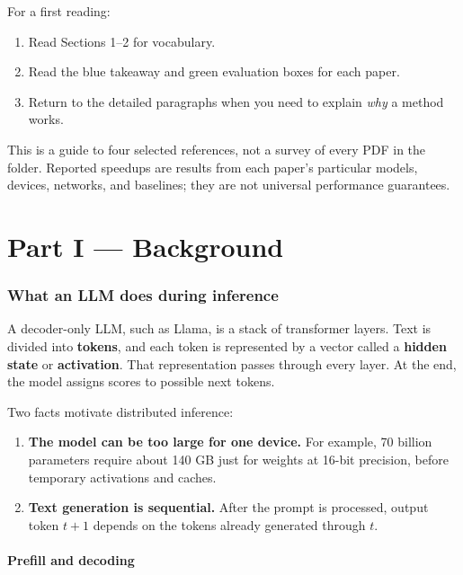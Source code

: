 \documentclass[10pt,a4paper]{article}
\newcommand{\term}[1]{\textbf{\color{navy}#1}}
\begin{document}
For a first reading:
\begin{enumerate}
  \item Read Sections 1--2 for vocabulary.
  \item Read the blue takeaway and green evaluation boxes for each paper.
  \item Return to the detailed paragraphs when you need to explain \emph{why} a method works.
\end{enumerate}

\begin{cautionbox}
This is a guide to four selected references, not a survey of every PDF in the folder. Reported speedups are results from each paper's particular models, devices, networks, and baselines; they are not universal performance guarantees.
\end{cautionbox}

\part*{Part I --- Background}

\section{What an LLM does during inference}

A decoder-only LLM, such as Llama, is a stack of transformer layers. Text is divided into \term{tokens}, and each token is represented by a vector called a \term{hidden state} or \term{activation}. That representation passes through every layer. At the end, the model assigns scores to possible next tokens.

Two facts motivate distributed inference:
\begin{enumerate}
  \item \textbf{The model can be too large for one device.} For example, 70 billion parameters require about 140 GB just for weights at 16-bit precision, before temporary activations and caches.
  \item \textbf{Text generation is sequential.} After the prompt is processed, output token $t+1$ depends on the tokens already generated through $t$.
\end{enumerate}

\subsection{Prefill and decoding}
\end{document}
